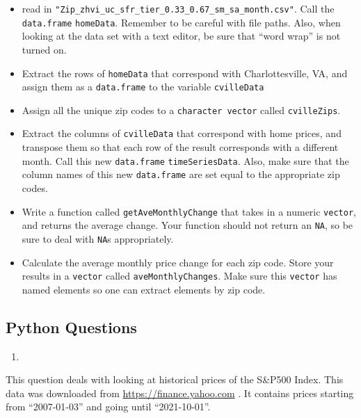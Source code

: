 \documentclass[12pt,krantz2]{krantz}
\providecommand{\tightlist}{%
  \setlength{\itemsep}{0pt}\setlength{\parskip}{0pt}}
\begin{document}
\begin{itemize}
\tightlist
\item
  read in \texttt{"Zip\_zhvi\_uc\_sfr\_tier\_0.33\_0.67\_sm\_sa\_month.csv"}. Call the \texttt{data.frame} \texttt{homeData}. Remember to be careful with file paths. Also, when looking at the data set with a text editor, be sure that ``word wrap'' is not turned on.
\item
  Extract the rows of \texttt{homeData} that correspond with Charlottesville, VA, and assign them as a \texttt{data.frame} to the variable \texttt{cvilleData}
\item
  Assign all the unique zip codes to a \texttt{character\ vector} called \texttt{cvilleZips}.
\item
  Extract the columns of \texttt{cvilleData} that correspond with home prices, and transpose them so that each row of the result corresponds with a different month. Call this new \texttt{data.frame} \texttt{timeSeriesData}. Also, make sure that the column names of this new \texttt{data.frame} are set equal to the appropriate zip codes.
\item
  Write a function called \texttt{getAveMonthlyChange} that takes in a numeric \texttt{vector}, and returns the average change. Your function should not return an \texttt{NA}, so be sure to deal with \texttt{NA}s appropriately.
\item
  Calculate the average monthly price change for each zip code. Store your results in a \texttt{vector} called \texttt{aveMonthlyChanges}. Make sure this \texttt{vector} has named elements so one can extract elements by zip code.
\end{itemize}

\hypertarget{python-questions-6}{%
\subsection{Python Questions}\label{python-questions-6}}

\begin{enumerate}
\def\labelenumi{\arabic{enumi}.}
\item
\end{enumerate}

This question deals with looking at historical prices of the S\&P500 Index. This data was downloaded from \url{https://finance.yahoo.com} \citep{gspc_data}. It contains prices starting from ``2007-01-03'' and going until ``2021-10-01''.
\end{document}
